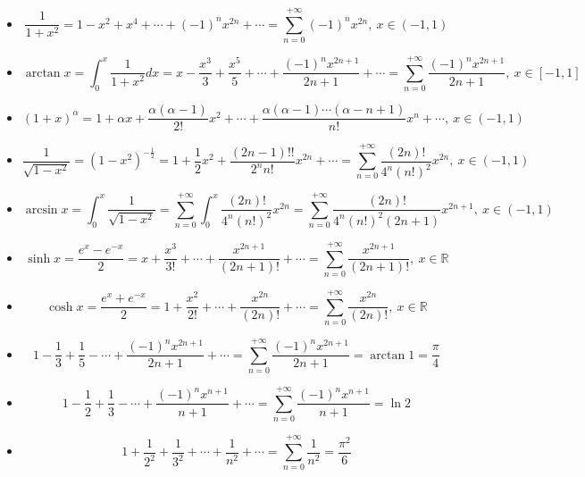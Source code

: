 \begin{proposition}[扩展泰勒级数]
	\begin{itemize}
		\item $$\dfrac{1}{1+x^2}=1-x^2+x^4+\cdots+(-1)^nx^{2n}+\cdots=\sum\limits_{n=0}^{+\infty}(-1)^nx^{2n},\ x\in(-1,1)$$
		\item $$\arctan x=\int_{0}^{x}\dfrac{1}{1+x^2}dx=x-\dfrac{x^3}{3}+\dfrac{x^5}{5}+\cdots+\dfrac{(-1)^{n}x^{2n+1}}{2n+1}+\cdots=\sum\limits_{n=0}^{+\infty}\dfrac{(-1)^{n}x^{2n+1}}{2n+1},\ x\in[-1,1]$$
		\item $$(1+x)^{\alpha}=1+\alpha x+\dfrac{\alpha(\alpha-1)}{2!}x^2+\cdots+\dfrac{\alpha(\alpha-1)\cdots(\alpha-n+1)}{n!}x^n+\cdots,\ x\in(-1,1)$$
		\item $$\dfrac{1}{\sqrt{1-x^2}}=(1-x^2)^{-\frac{1}{2}}=1+\dfrac{1}{2}x^2+\dfrac{(2n-1)!!}{2^nn!}x^{2n}+\cdots=\sum\limits_{n=0}^{+\infty}\dfrac{(2n)!}{4^n(n!)^2}x^{2n},\ x\in(-1,1)$$
		\item $$\arcsin x=\int_{0}^{x}\dfrac{1}{\sqrt{1-x^2}}=\sum\limits_{n=0}^{+\infty}\int_{0}^{x}\dfrac{(2n)!}{4^n(n!)^2}x^{2n}=\sum\limits_{n=0}^{+\infty}\dfrac{(2n)!}{4^n(n!)^2(2n+1)}x^{2n+1},\ x\in(-1,1)$$
		\item $$\sinh x=\dfrac{e^x-e^{-x}}{2}=x+\dfrac{x^3}{3!}+\cdots+\dfrac{x^{2n+1}}{(2n+1)!}+\cdots=\sum\limits_{n=0}^{+\infty}\dfrac{x^{2n+1}}{(2n+1)!},\ x\in\mathbb{R}$$
		\item $$\cosh x=\dfrac{e^x+e^{-x}}{2}=1+\dfrac{x^2}{2!}+\cdots+\dfrac{x^{2n}}{(2n)!}+\cdots=\sum\limits_{n=0}^{+\infty}\dfrac{x^{2n}}{(2n)!},\ x\in\mathbb{R}$$
	\end{itemize}
\end{proposition}
\begin{proposition}[常用数列和]
	\begin{itemize}
		\item $$1-\dfrac{1}{3}+\dfrac{1}{5}-\cdots+\dfrac{(-1)^nx^{2n+1}}{2n+1}+\cdots=\sum\limits_{n=0}^{+\infty}\dfrac{(-1)^nx^{2n+1}}{2n+1}=\arctan 1=\dfrac{\pi}{4}$$

		\item $$1-\dfrac{1}{2}+\dfrac{1}{3}-\cdots+\dfrac{(-1)^nx^{n+1}}{n+1}+\cdots=\sum\limits_{n=0}^{+\infty}\dfrac{(-1)^nx^{n+1}}{n+1}=\ln 2$$

		\item $$1+\dfrac{1}{2^2}+\dfrac{1}{3^2}+\cdots+\dfrac{1}{n^2}+\cdots=\sum\limits_{n=0}^{+\infty}\dfrac{1}{n^2}=\dfrac{\pi^2}{6}$$
	\end{itemize}
\end{proposition}

